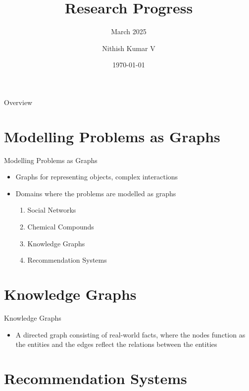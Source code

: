\documentclass[aspectratio=169,xcolor=dvipsnames]{beamer}
\title{Research Progress}
\subtitle{March 2025}
\author{Nithish Kumar V}
\institute
{
	Department of Computer Science and Engineering \\
	Indian Institute of Information Technology, Design and Manufacturing, Kancheepuram
}
\date{\today}
\begin{document}
	
	\begin{frame}
		\titlepage
	\end{frame}
	
	\begin{frame}{Overview}
		\tableofcontents
	\end{frame}
	\section{Modelling Problems as Graphs}
	\begin{frame}{Modelling Problems as Graphs}
		\begin{itemize}
			\item Graphs for representing objects, complex interactions			
			\item Domains where the problems are modelled as graphs
			\begin{enumerate}
				\item Social Networks
				\item Chemical Compounds
				\item Knowledge Graphs
				\item Recommendation Systems
			\end{enumerate}
		\end{itemize}
	\end{frame}
	
	\section{Knowledge Graphs}
	\begin{frame}{Knowledge Graphs}
		\begin{itemize}
			\item A directed
			graph consisting of real-world facts, where the nodes function as the entities and the edges reflect the relations between the entities \cite{9996555}
		\end{itemize}
	\end{frame}
	\section{Recommendation Systems}
	
\end{document}
